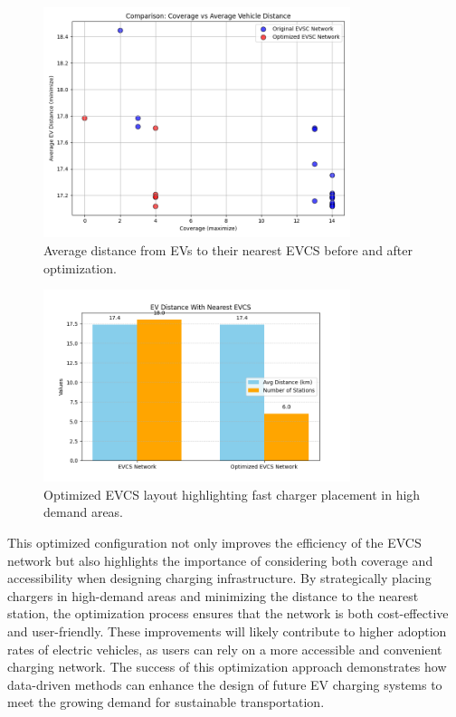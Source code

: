 \newpage

\begin{figure}[h!]
\centering
\includegraphics[width=0.8\textwidth]{../Figures/distance.png}
\caption{Average distance from EVs to their nearest EVCS before and after optimization.}
\label{fig:plot_distance_1}
\end{figure}

\newpage

\begin{figure}[h!]
\centering
\includegraphics[width=0.8\textwidth]{../Figures/ev_distance.png}
\caption{Optimized EVCS layout highlighting fast charger placement in high demand areas.}
\label{fig:plot_evcs_layout}
\end{figure}

\newpage






This optimized configuration not only improves the efficiency of the EVCS network but also highlights the importance of considering both coverage and accessibility when designing charging infrastructure. By strategically placing chargers in high-demand areas and minimizing the distance to the nearest station, the optimization process ensures that the network is both cost-effective and user-friendly. These improvements will likely contribute to higher adoption rates of electric vehicles, as users can rely on a more accessible and convenient charging network. The success of this optimization approach demonstrates how data-driven methods can enhance the design of future EV charging systems to meet the growing demand for sustainable transportation.





